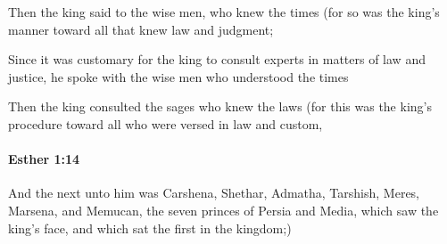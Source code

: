 			\begin{versebox}
					\item[BHS] 
					\item[LXX] 
					\item[ASV] Then the king said to the wise men, who knew the times (for so was the king's manner toward all that knew law and judgment;
					\item[NIV] Since it was customary for the king to consult experts in matters of law and justice, he spoke with the wise men who understood the times
					\item[NRSV] Then the king consulted the sages who knew the laws (for this was the king’s procedure toward all who were versed in law and custom,
			\end{versebox}

		\paragraph{Esther 1:14} %
			\label{ESTHER-1-14}

			And the next unto him was Carshena, Shethar, Admatha, Tarshish, Meres, Marsena, and Memucan, the seven princes of Persia and Media, which saw the king’s face, and which sat the first in the kingdom;)


